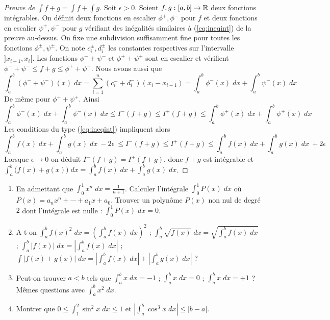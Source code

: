 \documentclass[class=report,crop=false]{standalone}
\begin{document}
\begin{proof}[Preuve de $\int f+g = \int f + \int g$]
Soit $\epsilon >0 $. Soient $f,g : [a,b] \to \mathbb{R}$ deux fonctions intégrables.
On définit deux fonctions en escalier $\phi^+,\phi^-$ pour $f$ et deux fonctions en escalier
$\psi^+,\psi^-$ pour $g$ vérifiant des inégalités  similaires à (\ref{eq:ineqint}) de la preuve au-dessus.
On fixe une subdivision suffisamment fine pour toutes les fonctions
$\phi^\pm, \psi^\pm$. On note $c_i^\pm, d_i^\pm$ les constantes respectives sur l'intervalle $]x_{i-1},x_i[$.
Les fonctions $\phi^- + \psi^-$ et $\phi^+ + \psi^+$ sont en escalier et vérifient  $\phi^- + \psi^- \le f+g \le \phi^+ + \psi^+$.
Nous avons aussi que
$$\int_a^b (\phi^-+\psi^-)(x)\;dx = \sum_{i=1}^n (c_i^-+d_i^-)(x_{i}-x_{i-1})
= \int_a^b \phi^-(x)\;dx+\int_a^b \psi^-(x)\;dx$$
De même pour $\phi^+ + \psi^+$.
Ainsi
{\small
$$\int_a^b  \phi^-(x)\;dx + \int_a^b \psi^-(x)\;dx \le I^-(f+g) \le I^+(f+g)
\le \int_a^b  \phi^+(x)\;dx + \int_a^b \psi^+(x)\;dx $$
}
Les conditions du type (\ref{eq:ineqint}) impliquent alors
{\small$$
\int_a^b f(x)\; dx+\int_a^b g(x)\; dx \  -2\epsilon \ \le I^-(f+g) 
\le I^+(f+g) \le \int_a^b f(x)\; dx+\int_a^b g(x)\; dx\  +2\epsilon
$$}
Lorsque $\epsilon\to 0$ on déduit $I^-(f+g) = I^+(f+g)$, donc $f+g$ est intégrable et
$\int_a^b \big(f(x)+ g(x)\big)\; dx = \int_a^b f(x)\; dx+\int_a^b g(x)\; dx$.
\end{proof}




\begin{miniexercices}
\sauteligne
\begin{enumerate}
  \item En admettant que $\int_0^1 x^n \; dx = \frac1{n+1}$. Calculer l'intégrale
$\int_0^1 P(x)\; dx$ où $P(x)=a_n x^n+\cdots+a_1x+a_0$. Trouver un polynôme $P(x)$
non nul de degré $2$ dont l'intégrale est nulle : $\int_0^1 P(x) \; dx=0$.

  \item A-t-on $\int_a^b f(x)^2 \; dx = \left( \int_a^b f(x) \; dx \right)^2$ ;
$\int_a^b \sqrt{f(x)} \; dx = \sqrt{\int_a^b f(x) \; dx}$ ;
$\int_a^b |f(x)| \; dx = \left| \int_a^b f(x) \; dx \right|$ ;
$\int |f(x)+g(x)| \; dx = \left| \int_a^b f(x) \; dx \right| + \left| \int_a^b g(x) \; dx \right|$ ?

  \item Peut-on trouver $a<b$ tels que $\int_a^b x\; dx = -1$ ;
$\int_a^b x\; dx = 0$ ; $\int_a^b x\; dx = +1$ ?
Mêmes questions avec $\int_a^b x^2 \; dx$.

  \item Montrer que $0 \le \int_1^2  \sin^2 x \; dx \le 1$ et $\left|\int_a^b \cos^3 x \; dx \right| \le |b-a|$.
\end{enumerate}
\end{miniexercices}
\end{document}
